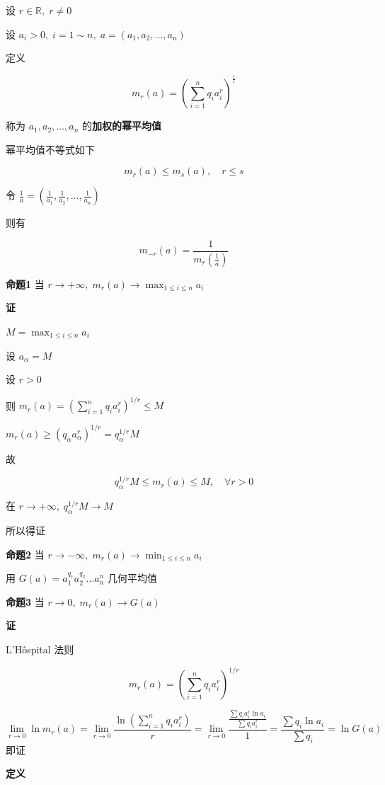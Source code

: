 设 \(r\in \mathbb{R}, \; r\neq 0\)

设 \(a_{i}>0, \; i=1\sim n, \; a=(a_{1},a_{2},\dots, a_{n})\)

定义

\[
m_{r}(a)=\left( \sum_{i=1}^{n}q_{i}a_{i}^{r} \right)^{\frac{1}{r}}
\]

称为 \(a_{1},a_{2},\dots,a_{n}\) 的\textbf{加权的幂平均值}

幂平均值不等式如下

\[
m_{r}(a)\leq m_{s}(a), \quad r\leq s
\]

令
\(\frac{1}{a}=\left( \frac{1}{a_{1}}, \frac{1}{a_{2}}, \dots, \frac{1}{a_{n}} \right)\)

则有

\[
m_{-r}(a)=\frac{1}{m_{r}\left( \frac{1}{a} \right)}
\]

\textbf{命题1} 当
\(r\to + \infty, \; m_{r}(a)\to \max_{1\leq i\leq n} a_{i}\)

\textbf{证}

\(M=\max_{1\leq i\leq n} a_{i}\)

设 \(a_{\alpha}=M\)

设 \(r>0\)

则 \(m_{r}(a)=\left( \sum_{i=1}^{n}q_{i}a_{i}^{r} \right)^{1/r}\leq M\)

\(m_{r}(a)\geq(q_{\alpha}a_{\alpha}^{r})^{1/r}=q_{\alpha}^{1/r}M\)

故

\[
q_{\alpha}^{1/r}M\leq m_{r}(a)\leq M, \quad \forall r>0
\]

在 \(r\to +\infty, \; q_{\alpha}^{1/r}M\to M\)

所以得证

\textbf{命题2} 当
\(r\to - \infty, \; m_{r}(a)\to \min_{1\leq i\leq n} a_{i}\)

用 \(G(a)=a_{1}^{q_{1}}a_{2}^{q_{2}}\dots a_{n}^{n}\) 几何平均值

\textbf{命题3} 当 \(r\to 0, \; m_{r}(a)\to G(a)\)

\textbf{证}

L'Hôspital 法则

\[
m_{r}(a)=\left( \sum_{i=1}^{n}q_{i}a_{i}^{r} \right)^{1/r}
\]

\[
\lim_{ r \to 0 } \ln m_{r}(a)= \lim_{ r \to 0}  \frac{\ln\left( \sum_{i=1}^{n}q_{i}a_{i}^{r} \right)}{r}  = \lim_{ r \to 0 } \frac{\frac{\sum q_{i} a_{i}^{r} \ln a_{i}}{\sum q_{i}a_{i}^{r}}}{1}=\frac{\sum q_{i} \ln a_{i}}{\sum q_{i}} = \ln G(a)
\] 即证

\textbf{定义}

